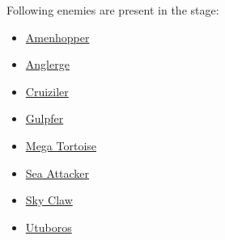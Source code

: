 Following enemies are present in the stage\cite{wiki:Ocean}:
\begin{itemize}
	\item \hyperlink{enem:Amenhopper}{Amenhopper}
	\item \hyperlink{miniboss:Anglerge}{Anglerge}
	\item \hyperlink{enem:Cruiziler}{Cruiziler}
	\item \hyperlink{enem:Gulpfer}{Gulpfer }
	\item \hyperlink{enem:Mega_Tortoise}{Mega Tortoise }
	\item \hyperlink{enem:Sea_Attacker}{Sea Attacker}
	\item \hyperlink{enem:Sky_Claw}{Sky Claw }
	\item \hyperlink{miniboss:Utuboros}{Utuboros}
\end{itemize}

